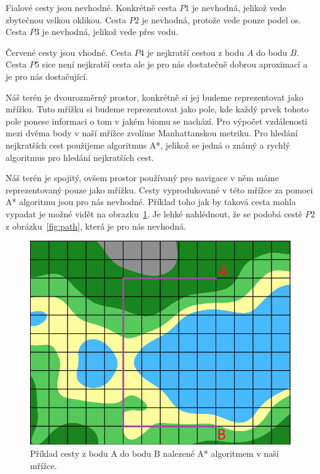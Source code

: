 Fialové cesty jsou nevhodné. Konkrétně cesta $P1$ je nevhodná, jelikož vede zbytečnou velkou oklikou. Cesta $P2$ je nevhodná, protože vede pouze podel os. Cesta $P3$ je nevhodná, jelikož vede přes vodu.

Červené cesty jsou vhodné. Cesta $P4$ je nejkratší cestou z bodu $A$ do bodu $B$. Cesta $P5$ sice není nejkratší cesta ale je pro nás dostatečně dobrou aproximací a je pro nás dostačující.

Náš terén je dvourozměrný prostor, konkrétně si jej budeme reprezentovat jako mřížku. Tuto mřížku si budeme reprezentovat jako pole, kde každý prvek tohoto pole ponese informaci o tom v jakém biomu se nachází. Pro výpočet vzdálenosti mezi dvěma body v naší mřížce zvolíme Manhattanskou metriku. Pro hledání nejkratších cest použijeme algoritmus A*, jelikož se jedná o známý a rychlý algoritmus pro hledání nejkratších cest. 

Náš terén je spojitý, ovšem prostor používaný pro navigace v něm máme reprezentovaný pouze jako mřížku. Cesty vyprodukované v této mřížce za pomoci A* algoritmu jsou pro nás nevhodné. Příklad toho jak by taková cesta mohla vypadat je možné vidět na obrazku~\ref{fig:path_grid}. Je lehké nahlédnout, že se podobá cestě $P2$ z obrázku~\ref{fig:path}, která je pro nás nevhodná.

\begin{figure}[!htb]
    \centering
    \includegraphics[width=0.66\linewidth]{img/path_grid.png}
    \caption{Příklad cesty z bodu A do bodu B nalezené A* algoritmem v naší mřížce.}
    \label{fig:path_grid}
\end{figure}

